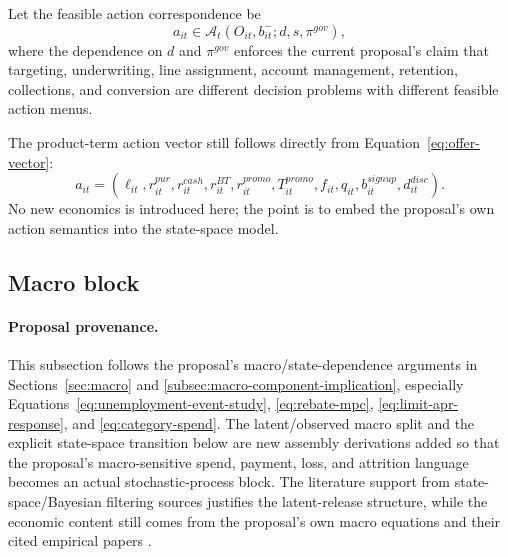 \documentclass[11pt]{article}
\newcommand{\1}{\mathbf{1}}
\begin{document}
Let the feasible action correspondence be
\begin{equation}
  a_{it}\in\mathcal{A}_{t}(O_{it},b_{it}^{-};d,s,\pi^{gov}),
  \label{eq:ss-feasible-actions}
\end{equation}
where the dependence on $d$ and $\pi^{gov}$ enforces the current proposal's
claim that targeting, underwriting, line assignment, account management,
retention, collections, and conversion are different decision problems with
different feasible action menus.

The product-term action vector still follows directly from
Equation~\eqref{eq:offer-vector}:
\begin{equation}
  a_{it}
  =
  (\ell_{it},r^{pur}_{it},r^{cash}_{it},r^{BT}_{it},r^{promo}_{it},
   T^{promo}_{it},f_{it},q_{it},b_{it}^{signup},d_{it}^{disc}).
  \label{eq:ss-action-vector}
\end{equation}
No new economics is introduced here; the point is to embed the proposal's own
action semantics into the state-space model.

\subsection{Macro block}
\label{subsec:state-space-macro-block}

\paragraph{Proposal provenance.}
This subsection follows the proposal's macro/state-dependence arguments in
Sections~\ref{sec:macro} and \ref{subsec:macro-component-implication},
especially Equations~\eqref{eq:unemployment-event-study},
\eqref{eq:rebate-mpc}, \eqref{eq:limit-apr-response}, and
\eqref{eq:category-spend}. The latent/observed macro split and the explicit
state-space transition below are new assembly derivations added so that the
proposal's macro-sensitive spend, payment, loss, and attrition language becomes
an actual stochastic-process block. The literature support from
state-space/Bayesian filtering sources justifies the latent-release structure,
while the economic content still comes from the proposal's own macro equations
and their cited empirical papers
\citep{durbinkoopman2012ssm,westharrison1997bfdm,
ganong2019unemployment,johnson2004rebates,gross2001liquidity,baker2020epidemic}.
\end{document}
